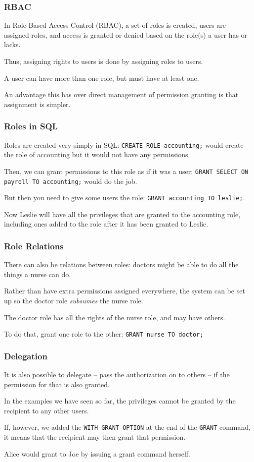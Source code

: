 \begin{frame}
\frametitle{RBAC}

In Role-Based Access Control (RBAC), a set of roles is created, users are assigned roles, and access is granted or denied based on the role(s) a user has or lacks.

Thus, assigning rights to users is done by assigning roles to users. 

A user can have more than one role, but must have at least one.

An advantage this has over direct management of permission granting is that assignment is simpler.

\end{frame}



\begin{frame}
\frametitle{Roles in SQL}

Roles are created very simply in SQL: \texttt{CREATE ROLE accounting;} would create the role of accounting but it would not have any permissions. 

Then, we can grant permissions to this role as if it was a user: \texttt{GRANT SELECT ON payroll TO accounting;} would do the job. 

But then you need to give some users the role: \texttt{GRANT accounting TO leslie;}. 

Now Leslie will have all the privileges that are granted to the accounting role, including ones added to the role after it has been granted to Leslie. 


\end{frame}


\begin{frame}
\frametitle{Role Relations}

There can also be relations between roles: doctors might be able to do all the things a nurse can do. 

Rather than have extra permissions assigned everywhere, the system can be set up so the doctor role \textit{subsumes} the nurse role.

The doctor role has all the rights of the nurse role, and may have others. 

To do that, grant one role to the other: \texttt{GRANT nurse TO doctor;}


\end{frame}



\begin{frame}
\frametitle{Delegation}

It is also possible to delegate -- pass the authorization on to others -- if the permission for that is also granted. 

In the examples we have seen so far, the privileges cannot be granted by the recipient to any other users. 

If, however, we added the \texttt{WITH GRANT OPTION} at the end of the \texttt{GRANT} command, it means that the recipient may then grant that permission.

Alice would grant to Joe by issuing a grant command herself.

\end{frame}



